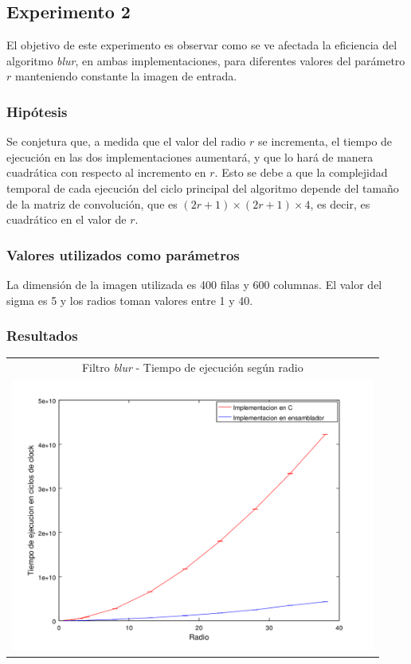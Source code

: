 	\subsection{Experimento 2}
		El objetivo de este experimento es observar como se ve afectada la eficiencia del algoritmo \emph{blur}, en ambas implementaciones, para diferentes valores del parámetro $r$ manteniendo constante la imagen de entrada.

		\subsubsection*{Hipótesis} 
			Se conjetura que, a medida que el valor del radio $r$ se incrementa, el tiempo de ejecución en las dos implementaciones aumentará, y que lo hará de manera cuadrática con respecto al incremento en $r$. Esto se debe a que la complejidad temporal de cada ejecución del ciclo principal del algoritmo depende del tamaño de la matriz de convolución, que es $(2r + 1) \times (2r + 1) \times 4$, es decir, es cuadrático en el valor de $r$.

		\subsubsection*{Valores utilizados como parámetros} 
		La dimensión de la imagen utilizada es 400 filas y 600 columnas. El valor del sigma es 5 y los radios toman valores entre 1 y 40.

		\subsubsection*{Resultados}

			{\centering \begin{tabular}{c}
	      		{\small Filtro \emph{blur} - Tiempo de ejecución según radio} \\
	      		\includegraphics[width=12cm]{../exp/graficos/exp2-tiempo_segun_radio.png} \\
	    	\end{tabular}}

